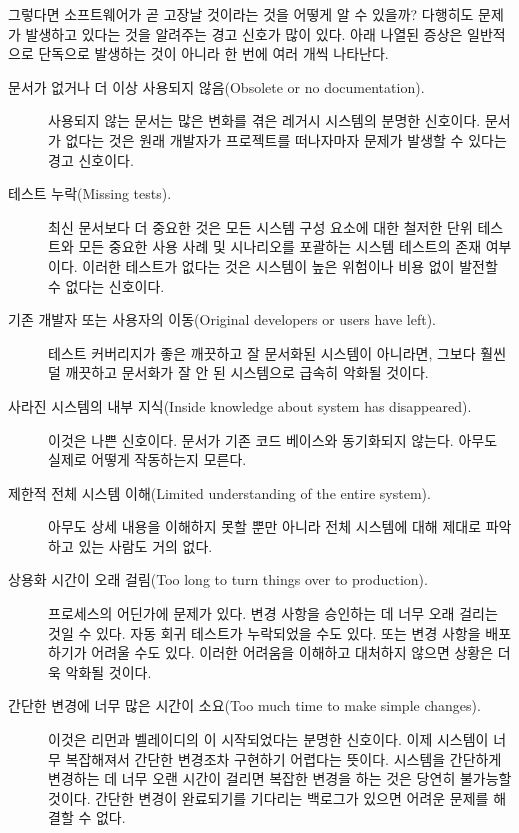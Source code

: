 \documentclass[a4paper,10pt,twoside]{book}
\begin{document}
그렇다면 소프트웨어가 곧 고장날 것이라는 것을 어떻게 알 수 있을까? 다행히도 문제가 발생하고 있다는 것을 알려주는 경고 신호가 많이 있다. 아래 나열된 증상은 일반적으로 단독으로 발생하는 것이 아니라 한 번에 여러 개씩 나타난다. 

\begin{description}
  \item[문서가 없거나 더 이상 사용되지 않음(Obsolete or no documentation).] 
사용되지 않는 문서는 많은 변화를 겪은 레거시 시스템의 분명한 신호이다. 문서가 없다는 것은 원래 개발자가 프로젝트를 떠나자마자 문제가 발생할 수 있다는 경고 신호이다.

  \item[테스트 누락(Missing tests).] 
최신 문서보다 더 중요한 것은 모든 시스템 구성 요소에 대한 철저한 단위 테스트와 모든 중요한 사용 사례 및 시나리오를 포괄하는 시스템 테스트의 존재 여부이다. 이러한 테스트가 없다는 것은 시스템이 높은 위험이나 비용 없이 발전할 수 없다는 신호이다.

  \item[기존 개발자 또는 사용자의 이동(Original developers or users have left).]
테스트 커버리지가 좋은 깨끗하고 잘 문서화된 시스템이 아니라면, 그보다 훨씬 덜 깨끗하고 문서화가 잘 안 된 시스템으로 급속히 악화될 것이다.

  \item[사라진 시스템의 내부 지식(Inside knowledge about system has disappeared).]
이것은 나쁜 신호이다. 문서가 기존 코드 베이스와 동기화되지 않는다. 아무도 실제로 어떻게 작동하는지 모른다.

  \item[제한적 전체 시스템 이해(Limited understanding of the entire system).]
아무도 상세 내용을 이해하지 못할 뿐만 아니라 전체 시스템에 대해 제대로 파악하고 있는 사람도 거의 없다. 

  \item[상용화 시간이 오래 걸림(Too long to turn things over to production).]
프로세스의 어딘가에 문제가 있다. 변경 사항을 승인하는 데 너무 오래 걸리는 것일 수 있다. 자동 회귀 테스트가 누락되었을 수도 있다. 또는 변경 사항을 배포하기가 어려울 수도 있다. 이러한 어려움을 이해하고 대처하지 않으면 상황은 더욱 악화될 것이다.

  \item[간단한 변경에 너무 많은 시간이 소요(Too much time to make simple changes).]
이것은 리먼과 벨레이디의 이 시작되었다는 분명한 신호이다. 이제 시스템이 너무 복잡해져서 간단한 변경조차 구현하기 어렵다는 뜻이다. 시스템을 간단하게 변경하는 데 너무 오랜 시간이 걸리면 복잡한 변경을 하는 것은 당연히 불가능할 것이다. 간단한 변경이 완료되기를 기다리는 백로그가 있으면 어려운 문제를 해결할 수 없다.


\end{description}
\end{document}
